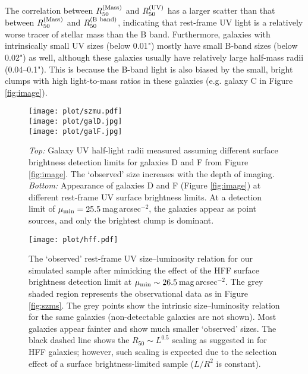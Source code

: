 \documentclass[useAMS,usenatbib]{mn2e}
\begin{document}
The correlation between $R_{50}^{\rm (Mass)}$ and $R_{50}^{\rm (UV)}$ has a larger scatter than that between $R_{50}^{\rm (Mass)}$ and $R_{50}^{\rm (B~band)}$, indicating that rest-frame UV light is a relatively worse tracer of stellar mass than the B band. Furthermore, galaxies with intrinsically small UV sizes (below 0.01") mostly have small B-band sizes (below 0.02") as well, although these galaxies usually have relatively large half-mass radii (0.04--0.1"). This is because the B-band light is also biased by the small, bright clumps with high light-to-mass ratios in these galaxies (e.g. galaxy C in Figure \ref{fig:image}).

\begin{figure}
\centering
\texttt{[image: plot/szmu.pdf]} \\
\vspace{0.4cm}
\texttt{[image: plot/galD.jpg]} \\
\texttt{[image: plot/galF.jpg]} 
\caption{{\em Top:} Galaxy UV half-light radii measured assuming different surface brightness detection limits for galaxies D and F from Figure \ref{fig:image}. The `observed' size increases with the depth of imaging. {\em Bottom:} Appearance of galaxies D and F (Figure \ref{fig:image}) at different rest-frame UV surface brightness limits. At a detection limit of $\mu_{\rm min}=25.5$\,mag\,arcsec$^{-2}$, the galaxies appear as point sources, and only the brightest clump is dominant.}
\label{fig:szmu}
\end{figure}

\begin{figure}
\centering
\texttt{[image: plot/hff.pdf]} 
\caption{The `observed' rest-frame UV size--luminosity relation for our simulated sample after mimicking the effect of the HFF surface brightness detection limit at $\mu_{\rm min}\sim26.5$\,mag\,arcsec$^{-2}$. The grey shaded region represents the observational data as in Figure \ref{fig:szms}. The grey points show the intrinsic size--luminosity relation for the same galaxies (non-detectable galaxies are not shown). Most galaxies appear fainter and show much smaller `observed' sizes. The black dashed line shows the $R_{50}\sim L^{0.5}$ scaling as suggested in \citet{bouwens.2017:small.galaxy.sizes} for HFF galaxies; however, such scaling is expected due to the selection effect of a surface brightness-limited sample ($L/R^2$ is constant).}
\label{fig:hff}
\end{figure}
\end{document}
